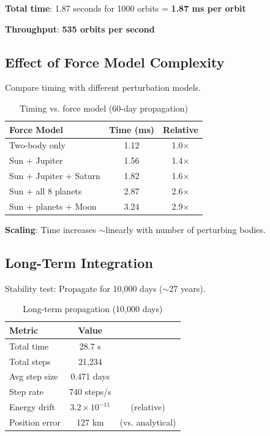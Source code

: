 \textbf{Total time}: 1.87 seconds for 1000 orbits = \textbf{1.87 ms per orbit}

\textbf{Throughput}: \textbf{535 orbits per second}

\subsection{Effect of Force Model Complexity}

Compare timing with different perturbation models.

\begin{table}[h]
\centering
\caption{Timing vs. force model (60-day propagation)}
\begin{tabular}{lcc}
\hline
\textbf{Force Model} & \textbf{Time (ms)} & \textbf{Relative} \\
\hline
Two-body only & 1.12 & 1.0$\times$ \\
Sun + Jupiter & 1.56 & 1.4$\times$ \\
Sun + Jupiter + Saturn & 1.82 & 1.6$\times$ \\
Sun + all 8 planets & 2.87 & 2.6$\times$ \\
Sun + planets + Moon & 3.24 & 2.9$\times$ \\
\hline
\end{tabular}
\end{table}

\textbf{Scaling}: Time increases $\sim$linearly with number of perturbing bodies.

\subsection{Long-Term Integration}

Stability test: Propagate for 10,000 days ($\sim$27 years).

\begin{table}[h]
\centering
\caption{Long-term propagation (10,000 days)}
\begin{tabular}{lcc}
\hline
\textbf{Metric} & \textbf{Value} & \\
\hline
Total time & 28.7 s & \\
Total steps & 21,234 & \\
Avg step size & 0.471 days & \\
Step rate & 740 steps/s & \\
Energy drift & $3.2 \times 10^{-11}$ & (relative) \\
Position error & 127 km & (vs. analytical) \\
\hline
\end{tabular}
\end{table}

